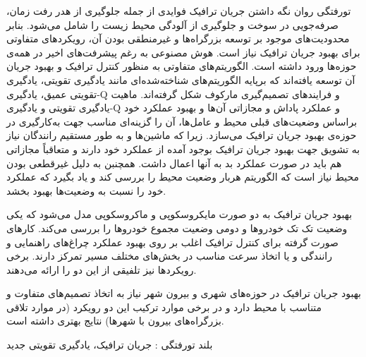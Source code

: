 


\pagestyle{empty}

‌تورفتگی
روان نگه داشتن جریان ترافیک فوایدی از جمله جلوگیری از هدر رفت زمان، صرفه‌جویی در سوخت و جلوگیری از آلودگی محیط زیست را شامل می‌شود.
بنابر محدودیت‌های موجود بر توسعه بزرگراه‌ها و غیرمنطقی بودن آن، رویکردهای متفاوتی برای بهبود جریان ترافیک نیاز است.
هوش مصنوعی به رغم پیشرفت‌های اخیر در همه‌ی حوزه‌ها ورود داشته است. الگوریتم‌های متفاوتی به منظور کنترل ترافیک و بهبود جریان آن توسعه یافته‌اند که برپایه الگوریتم‌های شناخته‌شده‌ای مانند یادگیری تقویتی، یادگیری تقویتی عمیق، یادگیری-Q و فرایندهای تصمیم‌گیری مارکوف شکل گرفته‌اند. ماهیت یادگیری تقویتی و یادگیری-Q و عملکرد پاداش و مجازاتی آن‌ها و بهبود عملکرد خود براساس وضعیت‌های قبلی محیط و عامل‌ها، آن را گزینه‌ای مناسب جهت به‌کارگیری در حوزه‌ی بهبود جریان ترافیک می‌سازد. زیرا که ماشین‌ها و به طور مستقیم رانندگان نیاز به تشویق جهت بهبود جریان ترافیک بوجود آمده از عملکرد خود دارند و متعاقباً مجازاتی هم باید در صورت عملکرد بد به آنها اعمال داشت. همچنبن به دلیل غیرقطعی بودن محیط نیاز است که الگوریتم هربار وضعیت محیط را بررسی کند و یاد بگیرد که عملکرد خود را نسبت به وضعیت‌ها بهبود بخشد.

بهبود جریان ترافیک به دو صورت مایکروسکوپی و ماکروسکوپی مدل می‌شود که یکی وضعیت تک تک خودروها و دومی وضعیت مجموع خودروها را بررسی می‌کند.
کارهای صورت گرفته برای کنترل ترافیک اغلب بر روی بهبود عملکرد چراغ‌های راهنمایی و رانندگی و یا اتخاذ سرعت مناسب در بخش‌های مختلف مسیر تمرکز دارند. برخی رویکردها نیز تلفیقی از این دو را ارائه می‌دهند.

بهبود جریان ترافیک در حوزه‌های شهری و بیرون شهر نیاز به اتخاذ تصمیم‌های متفاوت و متناسب با محیط دارد و در برخی موارد ترکیب این دو رویکرد (در موارد تلاقی بزرگراه‌های بیرون با شهرها) نتایج بهتری داشته است.

‌بلند
‌تورفتگی : 
جریان ترافیک، یادگیری تقویتی
‌جدید
